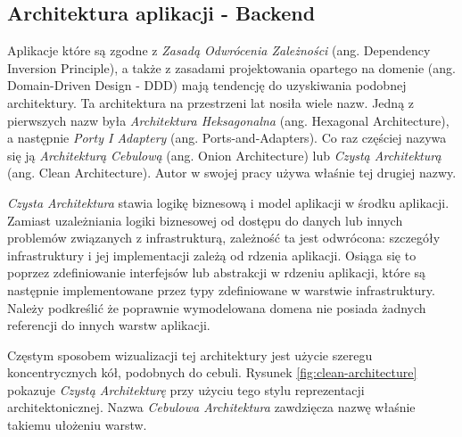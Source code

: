 \documentclass[12pt]{article}
\numberwithin{figure}{section}
\begin{document}
\begin{sloppypar}
\subsection{Architektura aplikacji - Backend}
    
Aplikacje które są zgodne z \textit{Zasadą Odwrócenia Zależności} (ang. Dependency Inversion Principle), a także z zasadami projektowania opartego na domenie (ang. Domain-Driven Design - DDD) mają tendencję do uzyskiwania podobnej architektury. Ta architektura na przestrzeni lat nosiła wiele nazw. Jedną z pierwszych nazw była \textit{Architektura Heksagonalna} (ang. Hexagonal Architecture), a następnie \textit{Porty I Adaptery} (ang. Ports-and-Adapters). Co raz częściej nazywa się ją \textit{Architekturą Cebulową} (ang. Onion Architecture) lub \textit{Czystą Architekturą} (ang. Clean Architecture). Autor w swojej pracy używa właśnie tej drugiej nazwy.

\textit{Czysta Architektura} stawia logikę biznesową i model aplikacji w środku aplikacji. Zamiast uzależniania logiki biznesowej od dostępu do danych lub innych problemów związanych z infrastrukturą, zależność ta jest odwrócona: szczegóły infrastruktury i jej implementacji zależą od rdzenia aplikacji. Osiąga się to poprzez zdefiniowanie interfejsów lub abstrakcji w rdzeniu aplikacji, które są następnie implementowane przez typy zdefiniowane w warstwie infrastruktury. Należy podkreślić że poprawnie wymodelowana domena nie posiada żadnych referencji do innych warstw aplikacji.
    
Częstym sposobem wizualizacji tej architektury jest użycie szeregu koncentrycznych kół, podobnych do cebuli. Rysunek \ref{fig:clean-architecture} pokazuje \textit{Czystą Architekturę} przy użyciu tego stylu reprezentacji architektonicznej. Nazwa \textit{Cebulowa Architektura} zawdzięcza nazwę właśnie takiemu ułożeniu warstw.
    

\end{sloppypar}
\end{document}
